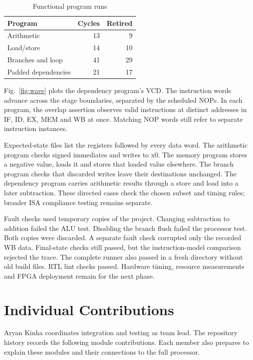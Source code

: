 \documentclass[conference]{IEEEtran}
\begin{document}
\begin{table}[t]
\caption{Functional program runs}
\label{tab:runs}\centering
\begin{tabular}{lrr}\hline
Program & Cycles & Retired\\\hline
Arithmetic & 13 & 9\\
Load/store & 14 & 10\\
Branches and loop & 41 & 29\\
Padded dependencies & 21 & 17\\\hline
\end{tabular}
\end{table}

Fig.~\ref{fig:wave} plots the dependency program's VCD. The instruction words advance across the stage boundaries, separated by the scheduled NOPs. In each program, the overlap assertion observes valid instructions at distinct addresses in IF, ID, EX, MEM and WB at once. Matching NOP words still refer to separate instruction instances.

Expected-state files list the registers followed by every data word. The arithmetic program checks signed immediates and writes to x0. The memory program stores a negative value, loads it and stores that loaded value elsewhere. The branch program checks that discarded writes leave their destinations unchanged. The dependency program carries arithmetic results through a store and load into a later subtraction. These directed cases check the chosen subset and timing rules; broader ISA compliance testing remains separate.

Fault checks used temporary copies of the project. Changing subtraction to addition failed the ALU test. Disabling the branch flush failed the processor test. Both copies were discarded. A separate fault check corrupted only the recorded WB data. Final-state checks still passed, but the instruction-model comparison rejected the trace. The complete runner also passed in a fresh directory without old build files. RTL lint checks passed. Hardware timing, resource measurements and FPGA deployment remain for the next phase.

\clearpage
\section{Individual Contributions}
Aryan Kinha coordinates integration and testing as team lead. The repository history records the following module contributions. Each member also prepares to explain these modules and their connections to the full processor.
\end{document}
